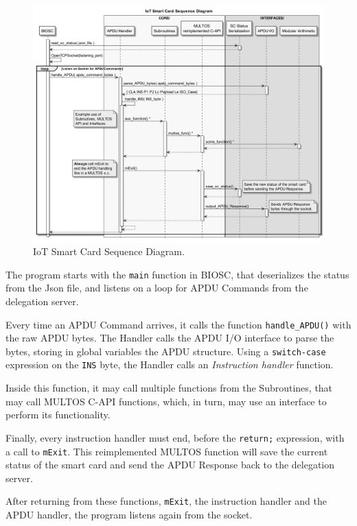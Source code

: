 \documentclass[journal]{IEEEtran}
\begin{document}
\begin{figure}[bth]
	\begin{center}
		\includegraphics[width=\linewidth]{gfx/UML/sequenceBIOSC}
	\end{center}
	\caption{IoT Smart Card Sequence Diagram.}
	\label{fig:sequenceBIOSC}
\end{figure}



The program starts with the \texttt{main} function in BIOSC, that deserializes the status from the Json file, and listens on a loop for APDU Commands from the delegation server.

Every time an APDU Command arrives, it calls the function \texttt{handle\_APDU()} with the raw APDU bytes. The Handler calls the APDU I/O interface to parse the bytes, storing in global variables the APDU structure. Using a \texttt{switch-case} expression on the \texttt{INS} byte, the Handler calls an \textit{Instruction handler} function.

Inside this function, it may call multiple functions from the Subroutines, that may call MULTOS C-API functions, which, in turn, may use an interface to perform its functionality.

Finally, every instruction handler must end, before the \texttt{return;} expression, with a call to \texttt{mExit}. This reimplemented MULTOS function will save the current status of the smart card and send the APDU Response back to the delegation server.

After returning from these functions, \texttt{mExit}, the instruction handler and the APDU handler, the program listens again from the socket.
\end{document}
